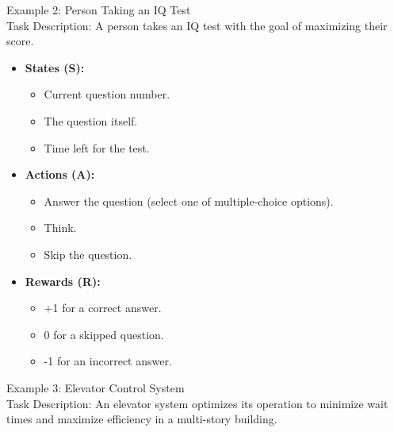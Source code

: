 Example 2: Person Taking an IQ Test\\
Task Description: A person takes an IQ test with the goal of maximizing their score.

\begin{itemize}
    \item \textbf{States (S):}
    \begin{itemize}
        \item Current question number.
        \item The question itself.
        \item Time left for the test.
    \end{itemize}
    
    \item \textbf{Actions (A):}
    \begin{itemize}
        \item Answer the question (select one of multiple-choice options).
        \item Think.
        \item Skip the question.
    \end{itemize}
    
    \item \textbf{Rewards (R):}
    \begin{itemize}
        \item +1 for a correct answer.
        \item 0 for a skipped question.
        \item -1 for an incorrect answer.
    \end{itemize}
\end{itemize}

Example 3: Elevator Control System\\
Task Description: An elevator system optimizes its operation to minimize wait times and maximize efficiency in a multi-story building.

